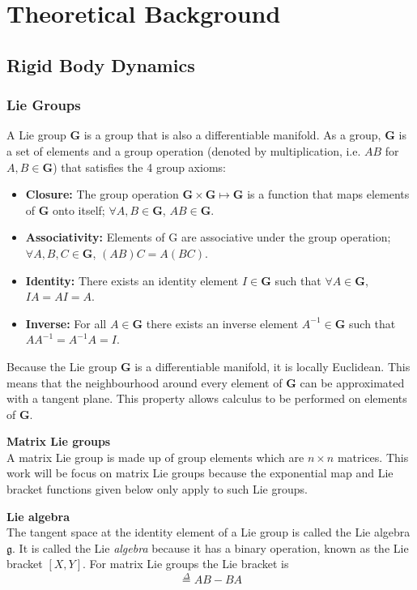 \section{Theoretical Background}

\subsection{Rigid Body Dynamics}
	\subsubsection{Lie Groups}		
		A Lie group $\mathbf{G}$ is a group that is also a differentiable manifold.
		As a group, $\mathbf{G}$ is a set of elements and a group operation (denoted by multiplication, i.e. $AB$ for $A,B \in \mathbf{G}$) that satisfies the 4 group axioms:
		
		\begin{itemize}
		\item \textbf{Closure:} 
			The group operation
			$\mathbf{G} \times \mathbf{G} \mapsto \mathbf{G}$ 
			is a function that maps elements of $\mathbf{G}$ onto itself;
			$\forall A,B \in \mathbf{G}$, $AB \in \mathbf{G}$.
		\item \textbf{Associativity:} Elements of G are associative under the group operation;
			$\forall A,B,C \in \mathbf{G}$, $(AB)C=A(BC)$.
		\item \textbf{Identity:} There exists an identity element $I \in \mathbf{G}$  such that
			$\forall A \in \mathbf{G}$, $IA = AI = A$.
		\item \textbf{Inverse:} For all $A \in \mathbf{G}$ there exists an inverse element $A^{-1} \in \mathbf{G}$ such that $AA^{-1}=A^{-1}A=I$. 
		\end{itemize}
		
		Because the Lie group $\mathbf{G}$ is a differentiable manifold, it is locally Euclidean. This means that the neighbourhood around every element of $\mathbf{G}$ can be approximated with a tangent plane. This property allows calculus to be performed on elements of $\mathbf{G}$.
		
		\textbf{Matrix Lie groups}\\
			A matrix Lie group is made up of group elements which are $n \times n$ matrices.
			This work will be focus on matrix Lie groups because the exponential map and Lie bracket functions given below only apply to such Lie groups.
		
		\textbf{Lie algebra}\\
			The tangent space at the identity element of a Lie group is called the Lie algebra $\mathfrak{g}$. It is called the Lie \textit{algebra} because it has a binary operation, known as the Lie bracket $[X,Y]$. For matrix Lie groups the Lie bracket is
			\begin{equation}
				[A,B] \stackrel{\Delta}{=} AB-BA
			\end{equation}
			
